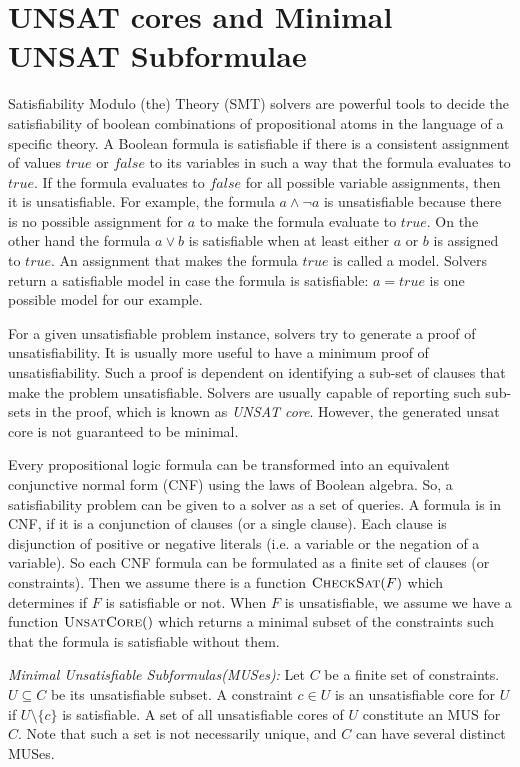 \section{UNSAT cores and Minimal UNSAT Subformulae}
\label{sec:muses}
Satisfiability Modulo (the) Theory (SMT) solvers are powerful tools to decide the
satisfiability of boolean combinations
of propositional atoms in the language of a specific theory. 
A Boolean formula is satisfiable if there is a consistent assignment of values $true$ or $false$ to its variables in such a way that the formula evaluates to $true$. If the formula evaluates to $false$ for all possible variable assignments, then it is unsatisfiable. For example, the formula
 $a \wedge \neg a$ is unsatisfiable because there is no possible 
 assignment for $a$ to make the formula 
 evaluate to $true$. 
 On the other hand the formula
  $a \vee b$ is satisfiable when at least 
  either $a$ or $b$ 
  is assigned to $true$. An assignment that makes the formula $true$ is called a model. Solvers return a satisfiable model in case the formula is satisfiable: $a = true$ is one possible model for our example.

For a given unsatisfiable problem instance, solvers try to generate a proof of unsatisfiability. It is usually more useful to have a minimum proof of unsatisfiability. Such a proof is dependent on identifying a sub-set of clauses that make the problem unsatisfiable. Solvers are usually capable of reporting such sub-sets in the proof, which is known as \emph{UNSAT core}. However, the generated unsat core is not guaranteed to be minimal.

Every propositional logic formula can be transformed into an equivalent conjunctive normal form (CNF) using the laws of Boolean algebra. So, a satisfiability problem can be given to a solver as a set of queries. A formula is in CNF, if it is a conjunction of clauses (or a single clause). Each clause is disjunction of positive or negative literals (i.e. a variable or the negation of a variable). So each CNF formula can be formulated as a finite set of clauses (or constraints). Then we assume there is a function $\textsc{CheckSat}(F)$ which determines if $F$ is satisfiable or not. 
When $F$ is unsatisfiable, we assume we
have a function $\textsc{UnsatCore}()$ which returns a minimal subset of the
constraints such that the formula is satisfiable without them. 

\begin{definition}{\emph{Minimal Unsatisfiable Subformulas(MUSes):}}
  \label{def:mus}
  Let $C$ be a finite set of constraints.
  $U \subseteq C$ be its unsatisfiable subset. 
  A constraint $c \in U$ is an 
  unsatisfiable core for $U$ if $U \setminus \{c\}$ is satisfiable.
  A set of all unsatisfiable cores of $U$ constitute 
  an MUS for $C$. 
  Note that such a set is not necessarily unique, and $C$ can have several distinct MUSes.
\end{definition}

